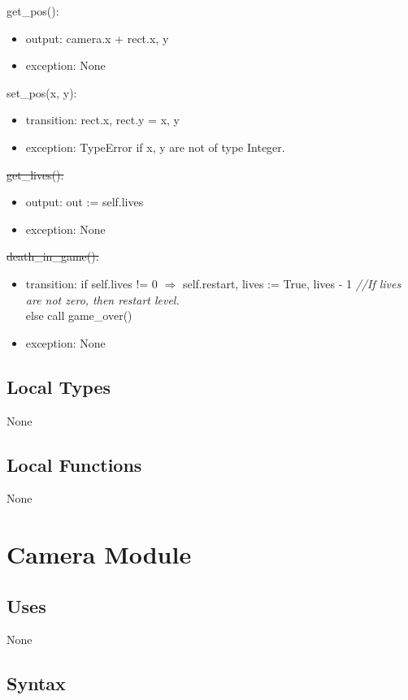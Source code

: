 \documentclass[12pt]{article}
\begin{document}
get\_pos():
\begin{itemize}
    \item output: camera.x + rect.x, y
    \item exception: None
\end{itemize}

set\_pos(x, y):
\begin{itemize}
    \item transition: rect.x, rect.y = x, y
    \item exception: TypeError if x, y are not of type Integer.
\end{itemize}

\st{get\_lives():}
\begin{itemize}
    \item output: out := self.lives
    \item exception: None
\end{itemize}

\st{death\_in\_game():}
\begin{itemize}
    \item transition: if self.lives != 0 $\Rightarrow$ self.restart, lives := True, lives - 1 \emph{//If lives are not zero, then restart level.}\\
    else call game\_over()
    \item exception: None
\end{itemize}


\subsection* {Local Types}

None

\subsection* {Local Functions}

None

\newpage

\section*{Camera Module}
\subsection*{Uses}
None
\subsection*{Syntax}
\end{document}
